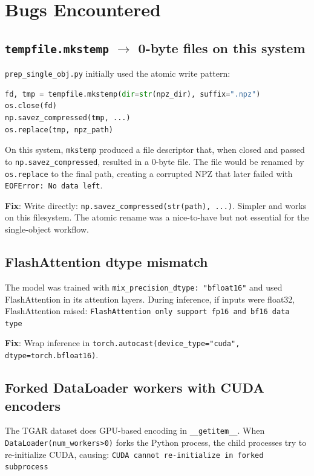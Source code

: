 \section{Bugs Encountered}

\subsection{\texttt{tempfile.mkstemp} $\rightarrow$ 0-byte files on this system}

\texttt{prep\_single\_obj.py} initially used the atomic write pattern:

\begin{lstlisting}[language=Python]
fd, tmp = tempfile.mkstemp(dir=str(npz_dir), suffix=".npz")
os.close(fd)
np.savez_compressed(tmp, ...)
os.replace(tmp, npz_path)
\end{lstlisting}

On this system, \texttt{mkstemp} produced a file descriptor that, when closed
and passed to \texttt{np.savez\_compressed}, resulted in a 0-byte file. The file
would be renamed by \texttt{os.replace} to the final path, creating a corrupted
NPZ that later failed with \texttt{EOFError: No data left}.

\textbf{Fix}: Write directly: \texttt{np.savez\_compressed(str(path), ...)}. Simpler
and works on this filesystem. The atomic rename was a nice-to-have but
not essential for the single-object workflow.

\subsection{FlashAttention dtype mismatch}

The model was trained with \texttt{mix\_precision\_dtype: "bfloat16"} and used
FlashAttention in its attention layers. During inference, if inputs were
float32, FlashAttention raised:
\texttt{FlashAttention only support fp16 and bf16 data type}

\textbf{Fix}: Wrap inference in \texttt{torch.autocast(device\_type="cuda", dtype=torch.bfloat16)}.

\subsection{Forked DataLoader workers with CUDA encoders}

The TGAR dataset does GPU-based encoding in \texttt{\_\_getitem\_\_}. When
\texttt{DataLoader(num\_workers\textgreater 0)} forks the Python process, the child processes
try to re-initialize CUDA, causing:
\texttt{CUDA cannot re-initialize in forked subprocess}

